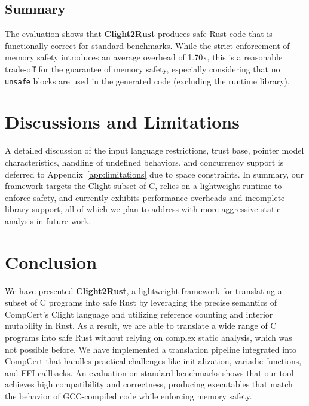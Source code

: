 \documentclass{llncs} %
\begin{document}
\subsection{Summary}
The evaluation shows that \textbf{Clight2Rust} produces safe Rust code that is functionally correct for standard benchmarks. While the strict enforcement of memory safety introduces an average overhead of 1.70x, this is a reasonable trade-off for the guarantee of memory safety, especially considering that no \texttt{unsafe} blocks are used in the generated code (excluding the runtime library).

\section{Discussions and Limitations}
\label{sec:discuss}
A detailed discussion of the input language restrictions, trust base, pointer model characteristics, handling of undefined behaviors, and concurrency support is deferred to Appendix~\ref{app:limitations} due to space constraints. In summary, our framework targets the Clight subset of C, relies on a lightweight runtime to enforce safety, and currently exhibits performance overheads and incomplete library support, all of which we plan to address with more aggressive static analysis in future work.

\section{Conclusion}
\label{sec:concl}

We have presented \textbf{Clight2Rust}, a lightweight framework for translating a subset of C programs into safe Rust by leveraging the precise semantics of CompCert's Clight language and utilizing reference counting and interior mutability in Rust.
As a result, we are able to translate a wide range of C programs into safe Rust without relying on complex static analysis, which was not possible before. We have implemented a translation pipeline integrated into CompCert that handles practical challenges like initialization, variadic functions, and FFI callbacks. An evaluation on standard benchmarks shows that our tool achieves high compatibility and correctness, producing executables that match the behavior of GCC-compiled code while enforcing memory safety.
\end{document}
